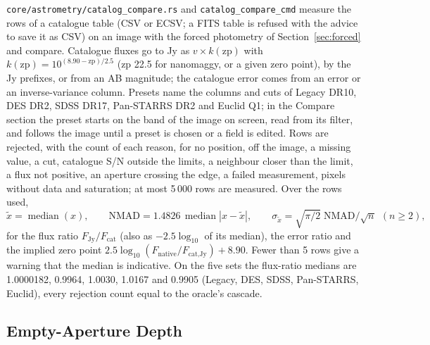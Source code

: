 \documentclass[11pt,a4paper]{article}
\newcommand{\code}[1]{\texttt{\small #1}}
\begin{document}
    \code{core/astrometry/catalog\_compare.rs} and \code{catalog\_compare\_cmd} measure the rows of a catalogue table (CSV or ECSV; a FITS table is refused with the advice to save it as CSV) on an image with the forced photometry of Section~\ref{sec:forced} and compare. Catalogue fluxes go to Jy as $v \times k(\text{zp})$ with $k(\text{zp}) = 10^{(8.90 - \text{zp})/2.5}$ (zp 22.5 for nanomaggy, or a given zero point), by the Jy prefixes, or from an AB magnitude; the catalogue error comes from an error or an inverse-variance column. Presets name the columns and cuts of Legacy DR10, DES DR2, SDSS DR17, Pan-STARRS DR2 and Euclid Q1; in the Compare section the preset starts on the band of the image on screen, read from its filter, and follows the image until a preset is chosen or a field is edited. Rows are rejected, with the count of each reason, for no position, off the image, a missing value, a cut, catalogue S/N outside the limits, a neighbour closer than the limit, a flux not positive, an aperture crossing the edge, a failed measurement, pixels without data and saturation; at most 5\,000 rows are measured. Over the rows used,
    \begin{equation}
        \tilde{x} = \operatorname{median}(x), \qquad \text{NMAD} = 1.4826\,\operatorname{median}|x - \tilde{x}|, \qquad \sigma_{\tilde{x}} = \sqrt{\pi/2}\;\text{NMAD}/\sqrt{n}\ \ (n \ge 2),
    \end{equation}
    for the flux ratio $F_{\text{Jy}}/F_{\text{cat}}$ (also as $-2.5\log_{10}$ of its median), the error ratio and the implied zero point $2.5\log_{10}(F_{\text{native}}/F_{\text{cat,Jy}}) + 8.90$. Fewer than 5 rows give a warning that the median is indicative. On the five sets the flux-ratio medians are 1.0000182, 0.9964, 1.0030, 1.0167 and 0.9905 (Legacy, DES, SDSS, Pan-STARRS, Euclid), every rejection count equal to the oracle's cascade.

    \subsection{Empty-Aperture Depth}
    \label{sec:depth}
\end{document}
